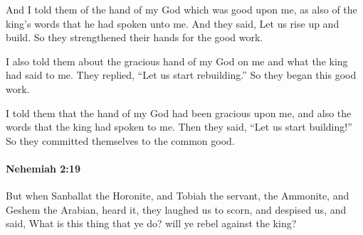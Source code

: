 			\begin{versebox}
					\item[BHS] 
					\item[LXX] 
					\item[ASV] And I told them of the hand of my God which was good upon me, as also of the king's words that he had spoken unto me. And they said, Let us rise up and build. So they strengthened their hands for the good work.
					\item[NIV] I also told them about the gracious hand of my God on me and what the king had said to me. They replied, “Let us start rebuilding.” So they began this good work.
					\item[NRSV] I told them that the hand of my God had been gracious upon me, and also the words that the king had spoken to me. Then they said, “Let us start building!” So they committed themselves to the common good.
			\end{versebox}

		\paragraph{Nehemiah 2:19} %
			\label{NEHEMIAH-2-19}

			But when Sanballat the Horonite, and Tobiah the servant, the Ammonite, and Geshem the Arabian, heard it, they laughed us to scorn, and despised us, and said, What is this thing that ye do? will ye rebel against the king?

